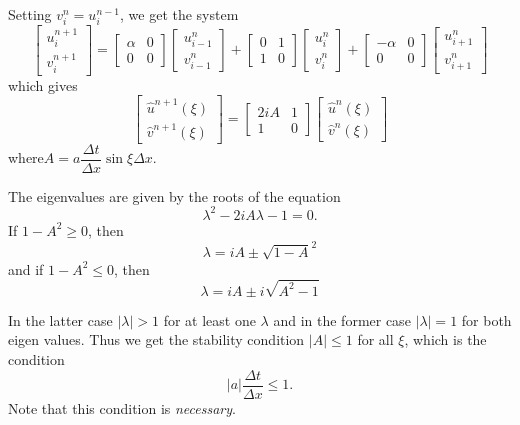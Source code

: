 Setting $v^n_i = u^{n-1}_i$, we get the system
$$
\begin{bmatrix}
u^{n+1}_i\\
v^{n+1}_i
\end{bmatrix} = 
\begin{bmatrix}
\alpha & 0\\
0 & 0
\end{bmatrix}
\begin{bmatrix}
u^n_{i-1}\\ v^n_{i-1}
\end{bmatrix}
+
\begin{bmatrix}
0 & 1\\
1 & 0
\end{bmatrix}
\begin{bmatrix}
u^n_i \\ v^n_i
\end{bmatrix}
+
\begin{bmatrix}
-\alpha & 0\\
0 & 0
\end{bmatrix}
\begin{bmatrix}
u^n_{i+1} \\ v^n_{i+1}
\end{bmatrix}
$$
which gives 
$$
\begin{bmatrix}
\hat{u}^{n+1}(\xi)\\
\hat{v}^{n+1}(\xi)
\end{bmatrix}
=
\begin{bmatrix}
2iA & 1 \\
1 & 0
\end{bmatrix}
\begin{bmatrix}
\hat{u}^n (\xi)\\
\hat{v}^n (\xi)
\end{bmatrix}
$$
where\pageoriginale $A = a\dfrac{\Delta t}{\Delta x} \sin\xi \Delta x$.

The eigenvalues are given by the roots of the equation 
$$
\lambda^2 - 2i A \lambda - 1 = 0.
$$
If $1-A^2 \geq 0$, then 
$$
\lambda = i A \pm \sqrt{1-A}^2
$$
and if $1-A^2 \leq 0$, then 
$$
\lambda = i A \pm i \sqrt{A^2 -1}
$$

In the latter case $|\lambda |>1$ for at least one $\lambda$ and in the former case $|\lambda| =1$ for both eigen values. Thus we get the stability condition $|A| \leq 1$ for all $\xi$, which is the condition
\begin{equation*}
|a| \frac{\Delta t}{\Delta x} \leq 1. \tag{8.28}\label{eq8.28}
\end{equation*}
Note that this condition is {\em necessary}.


